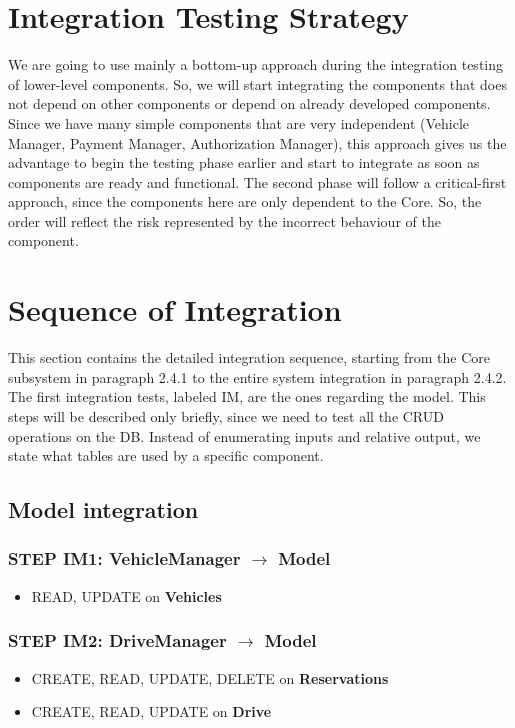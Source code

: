 \section{Integration Testing Strategy}
We are going to use mainly a bottom-up approach during the integration testing of lower-level components. So, we will start integrating the components that does not depend on other components or depend on already developed components. Since we have many simple components that are very independent (Vehicle Manager, Payment Manager, Authorization Manager), this approach gives us the advantage to begin the testing phase earlier and start to integrate as soon as components are ready and functional. 
The second phase will follow a critical-first approach, since the components here are only dependent to the Core. So, the order will reflect the risk represented by the incorrect behaviour of the component.

\section{Sequence of Integration}
This section contains the detailed integration sequence, starting from the Core subsystem in paragraph 2.4.1 to the entire system integration in paragraph 2.4.2. The first integration tests, labeled IM, are the ones regarding the model. This steps will be described only briefly, since we need to test all the CRUD operations on the DB. Instead of enumerating inputs and relative output, we state what tables are used by a specific component.

\subsection{Model integration}
\subsubsection{STEP IM1: VehicleManager $\rightarrow$ Model}
\begin{itemize}
	\item READ, UPDATE on \textbf{Vehicles}
\end{itemize}

\subsubsection{STEP IM2: DriveManager $\rightarrow$ Model}
\begin{itemize}
	\item CREATE, READ, UPDATE, DELETE on \textbf{Reservations}
	\item CREATE, READ, UPDATE on \textbf{Drive}
\end{itemize}

